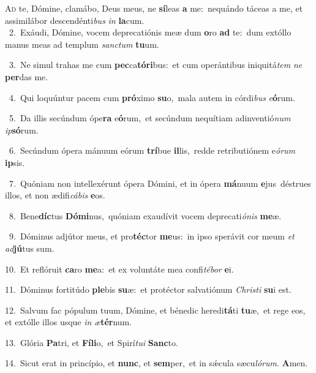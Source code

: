 \lettrine{\initial\textcolor{\initialcolor}{A}}{d} te, Dómine, clamábo, Deus meus, ne \textbf{sí}\-leas \textbf{a} me:~\star nequándo táceas a me, et assimilábor descendénti\textit{bus} \textit{in} \textbf{la}\-cum.\\
{\numbfont\textcolor{\numbcolor}{~2.}}~Exáudi, Dómine, vocem deprecatiónis meæ dum \textbf{o}\-ro \textbf{ad} te:~\star dum extóllo manus meas ad templum \textit{sanc}\-\textit{tum} \textbf{tu}\-um.\par
{\numbfont\textcolor{\numbcolor}{~3.}}~Ne simul trahas me cum \textbf{pec}\-ca\-\textbf{tó}\-\textbf{ri}bus:~\star et cum operántibus iniquitá\textit{tem} \textit{ne} \textbf{per}\-das me.\par
{\numbfont\textcolor{\numbcolor}{~4.}}~Qui loquúntur pacem cum \textbf{pró}\-ximo \textbf{su}\-o,~\star mala autem in córdi\textit{bus} \textit{e}\-\textbf{ó}rum.\par
{\numbfont\textcolor{\numbcolor}{~5.}}~Da illis secúndum ópe\textbf{ra} e\-\textbf{ó}\-rum,~\star et secúndum nequítiam adinventió\textit{num} \textit{ip}\-\textbf{só}rum.\par
{\numbfont\textcolor{\numbcolor}{~6.}}~Secúndum ópera mánuum eórum \textbf{trí}\-bue \textbf{il}\-lis,~\star redde retributiónem e\-\textit{ó}\-\textit{rum} \textbf{ip}\-sis.\par
{\numbfont\textcolor{\numbcolor}{~7.}}~Quóniam non intellexérunt ópera Dómini, et in ópera \textbf{má}\-nuum \textbf{e}\-jus~\star déstrues illos, et non ædifi\-\textit{cá}\-\textit{bis} \textbf{e}\-os.\par
{\numbfont\textcolor{\numbcolor}{~8.}}~Bene\-\textbf{díc}\-tus \textbf{Dó}\-\textbf{mi}nus,~\star quóniam exaudívit vocem deprecati\-\textit{ó}\-\textit{nis} \textbf{me}\-æ.\par
{\numbfont\textcolor{\numbcolor}{~9.}}~Dóminus adjútor meus, et pro\-\textbf{téc}\-tor \textbf{me}\-us:~\star in ipso sperávit cor meum \textit{et} \textit{ad}\-\textbf{jú}tus sum.\par
{\numbfont\textcolor{\numbcolor}{10.}}~Et reflóruit \textbf{ca}\-ro \textbf{me}\-a:~\star et ex voluntáte mea confi\-\textit{té}\-\textit{bor} \textbf{e}\-i.\par
{\numbfont\textcolor{\numbcolor}{11.}}~Dóminus fortitúdo \textbf{ple}\-bis \textbf{su}\-æ:~\star et protéctor salvatiónum \textit{Chris}\-\textit{ti} \textbf{su}\-i est.\par
{\numbfont\textcolor{\numbcolor}{12.}}~Salvum fac pópulum tuum, Dómine, et bénedic heredi\-\textbf{tá}\-ti \textbf{tu}\-æ,~\star et rege eos, et extólle illos usque \textit{in} \textit{æ}\-\textbf{tér}num.\par
{\numbfont\textcolor{\numbcolor}{13.}}~Glória \textbf{Pa}\-tri, et \textbf{Fí}\-\textbf{li}o,~\star et Spirí\-\textit{tu}\-\textit{i} \textbf{Sanc}\-to.\par
{\numbfont\textcolor{\numbcolor}{14.}}~Sicut erat in princípio, et \textbf{nunc}\-, et \textbf{sem}\-per,~\star et in sǽcula sæcu\-\textit{ló}\-\textit{rum}. \textbf{A}\-men.\par
